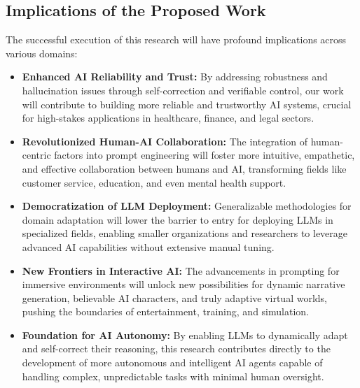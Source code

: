 \documentclass{article}
\begin{document}
\subsection{Implications of the Proposed Work}
The successful execution of this research will have profound implications across various domains:
\begin{itemize}
    \item \textbf{Enhanced AI Reliability and Trust:} By addressing robustness and hallucination issues through self-correction and verifiable control, our work will contribute to building more reliable and trustworthy AI systems, crucial for high-stakes applications in healthcare, finance, and legal sectors.
    \item \textbf{Revolutionized Human-AI Collaboration:} The integration of human-centric factors into prompt engineering will foster more intuitive, empathetic, and effective collaboration between humans and AI, transforming fields like customer service, education, and even mental health support.
    \item \textbf{Democratization of LLM Deployment:} Generalizable methodologies for domain adaptation will lower the barrier to entry for deploying LLMs in specialized fields, enabling smaller organizations and researchers to leverage advanced AI capabilities without extensive manual tuning.
    \item \textbf{New Frontiers in Interactive AI:} The advancements in prompting for immersive environments will unlock new possibilities for dynamic narrative generation, believable AI characters, and truly adaptive virtual worlds, pushing the boundaries of entertainment, training, and simulation.
    \item \textbf{Foundation for AI Autonomy:} By enabling LLMs to dynamically adapt and self-correct their reasoning, this research contributes directly to the development of more autonomous and intelligent AI agents capable of handling complex, unpredictable tasks with minimal human oversight.
\end{itemize}
\end{document}
